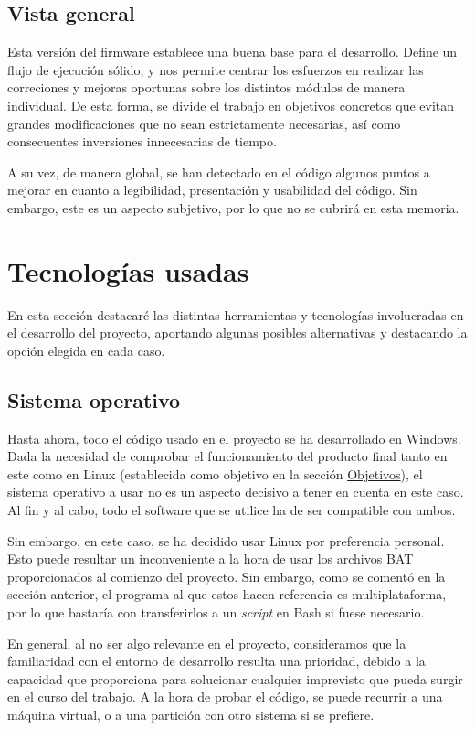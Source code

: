 \subsection{Vista general}

Esta versión del firmware establece una buena base para el desarrollo. Define un flujo de ejecución sólido, y nos permite centrar los esfuerzos en realizar las correciones y mejoras oportunas sobre los distintos módulos de manera individual. De esta forma, se divide el trabajo en objetivos concretos que evitan grandes modificaciones que no sean estrictamente necesarias, así como consecuentes inversiones innecesarias de tiempo.

A su vez, de manera global, se han detectado en el código algunos puntos a mejorar en cuanto a legibilidad, presentación y usabilidad del código. Sin embargo, este es un aspecto subjetivo, por lo que no se cubrirá en esta memoria.

\section{Tecnologías usadas}

En esta sección destacaré las distintas herramientas y tecnologías involucradas en el desarrollo del proyecto, aportando algunas posibles alternativas y destacando la opción elegida en cada caso.

\subsection{Sistema operativo}

Hasta ahora, todo el código usado en el proyecto se ha desarrollado en Windows. Dada la necesidad de comprobar el funcionamiento del producto final tanto en este como en Linux (establecida como objetivo en la sección \hyperref[sec:objetivos]{Objetivos}), el sistema operativo a usar no es un aspecto decisivo a tener en cuenta en este caso. Al fin y al cabo, todo el software que se utilice ha de ser compatible con ambos.

Sin embargo, en este caso, se ha decidido usar Linux por preferencia personal. Esto puede resultar un inconveniente a la hora de usar los archivos BAT proporcionados al comienzo del proyecto. Sin embargo, como se comentó en la sección anterior, el programa al que estos hacen referencia es multiplataforma, por lo que bastaría con transferirlos a un \textit{script} en Bash si fuese necesario.

En general, al no ser algo relevante en el proyecto, consideramos que la familiaridad con el entorno de desarrollo resulta una prioridad, debido a la capacidad que proporciona para solucionar cualquier imprevisto que pueda surgir en el curso del trabajo. A la hora de probar el código, se puede recurrir a una máquina virtual, o a una partición con otro sistema si se prefiere.

